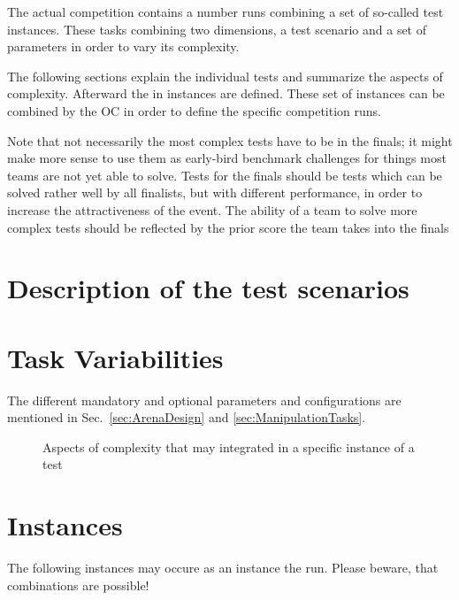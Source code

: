 
The actual competition contains a number runs combining a set of so-called
test instances. These tasks combining two dimensions, a test scenario and a
set of parameters in order to vary its complexity.

The following sections explain the individual tests and summarize the aspects of
complexity. Afterward the in instances are defined. These set of instances can
be combined by the OC in order to define the specific competition runs.

Note that not necessarily the most complex tests have to be in the finals;
it might make more sense to use them as early-bird benchmark challenges for
things most teams are not yet able to solve. Tests for the finals should be
tests which can be solved rather well by all finalists, but with different
performance, in order to increase the attractiveness of the event. The ability
of a team to solve more complex tests should be reflected by the prior score
the team takes into the finals

\section{Description of the test scenarios}



\section{Task Variabilities}

The different mandatory and optional parameters and configurations are 
mentioned in Sec.~\ref{sec:ArenaDesign} and \ref{sec:ManipulationTasks}.

\begin{figure}[ht]
\centering

\caption{Aspects of complexity that may integrated in a specific instance of a test}
\end{figure}









\section{Instances}

The following instances may occure as an instance the run. Please beware, that
combinations are possible!




